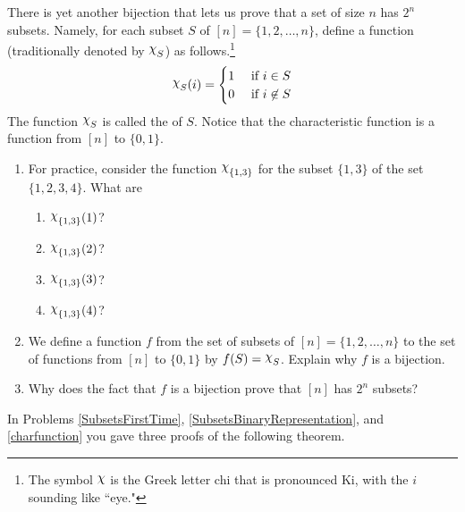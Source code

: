 \item  There is yet another bijection that lets us prove  that a set of
size $n$ has $2^n$ subsets.  Namely, for each subset $S$ of
$[n]=\{1,2,\ldots, n\}$, define a function (traditionally
denoted by $\Chi_S$) as follows.\footnote{The symbol
$\Chi$ is the Greek letter chi that is pronounced Ki, with the
$i$ sounding like ``eye."} 
$$\Chi_S(i) = \begin{cases}1 &\mbox{ if } i\in S \\ 0 &\mbox{ if } i\not\in
S\end{cases}$$ The function $\Chi_S$ is called the  of
$S$.  Notice that the characteristic function is a function
from $[n]$ to
$\{0,1\}$.\label{charfunction}
\begin{enumerate}
\item For practice, consider the function $\Chi_{\{1,3\}}$ for
the subset
$\{1,3\}$ of the set $\{1,2,3,4\}$.  What are
\begin{enumerate}
\item $\Chi_{\{1,3\}}(1)$?
\item $\Chi_{\{1,3\}}(2)$?
\item $\Chi_{\{1,3\}}(3)$?
\item $\Chi_{\{1,3\}}(4)$?
\end{enumerate}
\item We define a function $f$ from the set of subsets of
$[n]=\{1,2,\ldots, n\}$ to the set of functions from $[n]$ to
$\{0,1\}$ by $f(S)=\Chi_S$.  Explain why $f$ is a bijection. 
\item Why does the fact that $f$ is a bijection prove that
$[n]$ has $2^n$ subsets?
\end{enumerate}


\ep

In Problems \ref{SubsetsFirstTime}, \ref{SubsetsBinaryRepresentation}, and
\ref{charfunction} you gave three proofs of the following
theorem.

